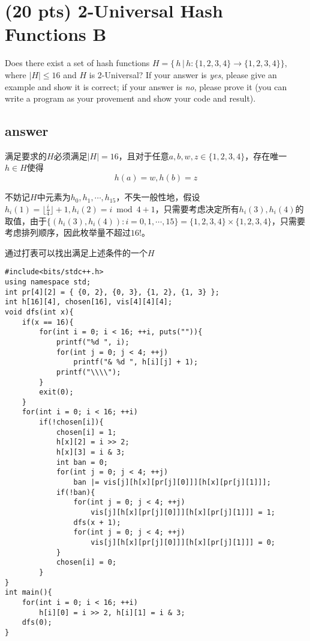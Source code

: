\documentclass[12pt]{article}
\begin{document}
\section{(20 pts) 2-Universal Hash Functions B}

Does there exist a set of hash functions $H = \{ \, h \, | \, h:\{1, 2, 3, 4\} \rightarrow \{1, 2, 3, 4\} \}$, where $|H| \leq 16$ and $H$ is 2-Universal? If your answer is \emph{yes}, please give an example and show it is correct; if your answer is \emph{no}, please prove it (you can write a program as your provement and show your code and result).
\subsection*{answer}

满足要求的$H$必须满足$|H| = 16$，且对于任意$a, b, w, z\in \{1, 2, 3, 4\}$，存在唯一$h \in H$使得
\begin{equation}
h(a) = w, h(b) = z
\end{equation}

不妨记$H$中元素为$h_0, h_1, \cdots, h_{15}$，不失一般性地，假设$h_i(1) = \lfloor \frac i4 \rfloor + 1, h_i(2) = i \bmod 4 + 1$，只需要考虑决定所有$h_i(3), h_i(4)$的取值，由于$\{(h_i(3), h_i(4)): i = 0, 1, \cdots, 15\} = \{1, 2, 3, 4\} \times \{1, 2, 3, 4\}$，只需要考虑排列顺序，因此枚举量不超过$16!$。

通过打表可以找出满足上述条件的一个$H$
\newpage
\begin{verbatim}
#include<bits/stdc++.h>
using namespace std;
int pr[4][2] = { {0, 2}, {0, 3}, {1, 2}, {1, 3} };
int h[16][4], chosen[16], vis[4][4][4];
void dfs(int x){
    if(x == 16){
        for(int i = 0; i < 16; ++i, puts("")){
            printf("%d ", i);
            for(int j = 0; j < 4; ++j)
                printf("& %d ", h[i][j] + 1);
            printf("\\\\");
        }
        exit(0);
    }
    for(int i = 0; i < 16; ++i)
        if(!chosen[i]){
            chosen[i] = 1;
            h[x][2] = i >> 2;
            h[x][3] = i & 3;
            int ban = 0;
            for(int j = 0; j < 4; ++j)
                ban |= vis[j][h[x][pr[j][0]]][h[x][pr[j][1]]];
            if(!ban){
                for(int j = 0; j < 4; ++j)
                    vis[j][h[x][pr[j][0]]][h[x][pr[j][1]]] = 1;
                dfs(x + 1);
                for(int j = 0; j < 4; ++j)
                    vis[j][h[x][pr[j][0]]][h[x][pr[j][1]]] = 0;
            }
            chosen[i] = 0;
        }
}
int main(){
    for(int i = 0; i < 16; ++i)
        h[i][0] = i >> 2, h[i][1] = i & 3;
    dfs(0);
}
\end{verbatim}
\end{document}
